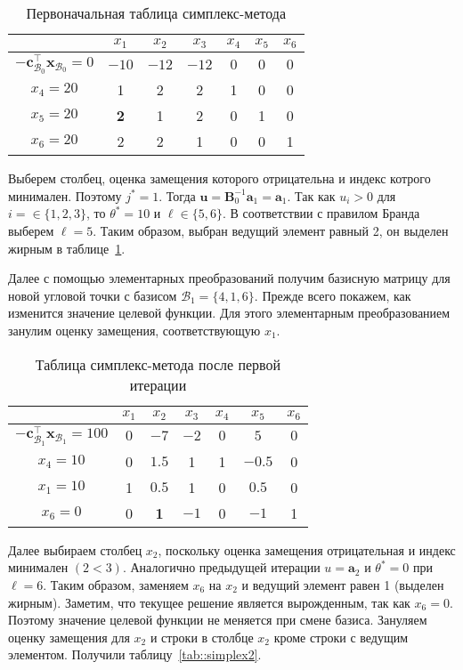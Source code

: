 \documentclass[12pt]{article}
\newcommand{\bx}{\mathbf{x}}
\begin{document}
\begin{table}[!ht]
\centering
\caption{Первоначальная таблица симплекс-метода}
\begin{tabular}{|c|cccccc|}
\hline
& $x_1$ & $x_2$ & $x_3$ & $x_4$ & $x_5$ & $x_6$\\
\hline
$-\mathbf{c}_{\mathcal{B}_0}^{\top}\bx_{\mathcal{B}_0} = 0$ & $-10$ & $-12$ & $-12$ & $0$ & $0$ & $0$ \\
\hline
$x_4 = 20$ & 1 & 2 & 2 & 1 & 0 & 0 \\
$x_5 = 20$ & \textbf{2} & 1 & 2 & 0 & 1 & 0 \\
$x_6 = 20$ & 2 & 2 & 1 & 0 & 0 & 1 \\
\hline
\end{tabular}
\label{tab::simplex0}
\end{table}
Выберем столбец, оценка замещения которого отрицательна и индекс котрого минимален.
Поэтому $j^* = 1$.
Тогда $\mathbf{u} = \mathbf{B}^{-1}_0\mathbf{a}_1 = \mathbf{a}_1.$
Так как $u_i > 0$ для $i= \in \{1,2,3\}$, то $\theta^* = 10$ и $\ell \in \{5, 6\}$.
В соответствии с правилом Бранда выберем $\ell = 5$.
Таким образом, выбран ведущий элемент равный 2, он выделен жирным в таблице~\ref{tab::simplex0}.

Далее с помощью элементарных преобразований получим базисную матрицу для новой угловой точки с базисом $\mathcal{B}_1 = \{4, 1, 6\}$. 
Прежде всего покажем, как изменится значение целевой функции.
Для этого элементарным преобразованием занулим оценку замещения, соответствующую $x_1$.

\begin{table}[!ht]
\centering
\caption{Таблица симплекс-метода после первой итерации}
\begin{tabular}{|c|cccccc|}
\hline
& $x_1$ & $x_2$ & $x_3$ & $x_4$ & $x_5$ & $x_6$\\
\hline
$-\mathbf{c}_{\mathcal{B}_1}^{\top}\bx_{\mathcal{B}_1} = 100$ & $0$ & $-7$ & $-2$ & $0$ & $5$ & $0$ \\
\hline
$x_4 = 10$ & 0 & $1.5$ & 1 & 1 & $-0.5$ & 0 \\
$x_1 = 10$ & 1 & $0.5$ & 1 & 0 & $0.5$ & 0 \\
$x_6 = 0$ & 0 & \textbf{1} & $-1$ & 0 & $-1$ & 1 \\
\hline
\end{tabular}
\label{tab::simplex1}
\end{table}

Далее выбираем столбец $x_2$, поскольку оценка замещения отрицательная и индекс минимален $(2 < 3)$.
Аналогично предыдущей итерации $u = \mathbf{a}_2$ и $\theta^* = 0$ при $\ell = 6$. 
Таким образом, заменяем $x_6$ на $x_2$ и ведущий элемент равен 1 (выделен жирным). 
Заметим, что текущее решение является вырожденным, так как $x_6 = 0$. 
Поэтому значение целевой функции не меняется при смене базиса. 
Зануляем оценку замещения для $x_2$ и строки в столбце $x_2$ кроме строки с ведущим элементом. 
Получили таблицу~\ref{tab::simplex2}.
\end{document}
